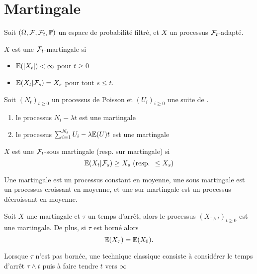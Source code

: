 \section{Martingale}\label{sec:temps_arret_contd}
Soit $(\Omega,\mathcal{F}, \mathcal{F}_t,\mathbb{P})$ un espace de probabilité filtré, et $X$ un processus $\mathcal{F}_t$-adapté.
\begin{definition}\label{def:martingale_contd}
$X$ est une $\mathcal{F}_t$-martingale si 
\begin{itemize}
    \item $\mathbb{E}(|X_t|)<\infty$ pour $t\geq 0$
    \item $\mathbb{E}(X_t|\mathcal{F}_s) = X_s$ pour tout $s\leq t$.
\end{itemize}
\end{definition}
\begin{ex}
Soit $(N_t)_{t\geq 0}$ un processus de Poisson et $(U_i)_{i\geq 0}$ une suite de \va \iid.
\begin{enumerate}
    \item le processus $N_t-\lambda t$ est une martingale
    \item le processus $\sum_{i = 1}^{N_t}U_i-\lambda\mathbb{E}(U) t$ est une martingale
\end{enumerate}
\end{ex}
\begin{definition}
$X$ est une $\mathcal{F}_t$-sous martingale (resp. sur martingale) si 
$$
 \mathbb{E}(X_t|\mathcal{F}_s) \geq X_s\text{ (resp. }\leq X_s) 
$$
\end{definition}
Une martingale est un processus constant en moyenne, une sous martingale est un processus croissant en moyenne, et une sur martingale est un processus décroissant en moyenne.
\begin{theo}
Soit $X$ une martingale et $\tau$ un temps d'arrêt, alors le processus $(X_{\tau\land t})_{t\geq 0}$ est une martingale. De plus, si $\tau$ est borné alors 
$$
\mathbb{E}(X_\tau) = \mathbb{E}(X_0).
$$
\end{theo}
\begin{remark}
Lorsque $\tau$ n'est pas bornée, une technique classique consiste à considérer le temps d'arrêt $\tau\land t$ puis à faire tendre $t$ vers $\infty$
\end{remark}

